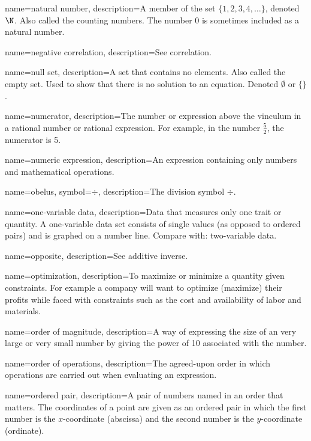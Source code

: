  {
	name=natural number,
	description={A member of the set $\{1, 2, 3, 4, \dotsc\}$, denoted $\N$. Also called the counting numbers. The number 0 is sometimes included as a natural number.}
}

 {
	name=negative correlation,
	description={See \gls{correlation}.}
}

 {
	name=null set,
	description={A set that contains no elements. Also called the empty set. Used to show that there is no solution to an equation. Denoted $\emptyset$ or $\{ \}$.}
}

 {
	name=numerator,
	description={The number or expression above the \gls{vinculum} in a \gls{rational number} or \gls{rational expression}. For example, in the number $\frac{5}{2}$, the numerator is 5.}
}

 {
	name=numeric expression,
	description={An expression containing only numbers and mathematical operations.}
}

 {
	name=obelus,
	symbol={$\div$},
	description={The division symbol $\div$.}
}

 {
	name=one-variable data,
	description={Data that measures only one trait or quantity. A one-variable data set consists of single values (as opposed to ordered pairs) and is graphed on a number line. Compare with: \gls{two-variable data}.}
}

 {
	name=opposite,
	description={See \gls{additive inverse}.}
}

 {
	name=optimization,
	description={To maximize or minimize a quantity given constraints. For example a company will want to optimize (maximize) their profits while faced with constraints such as the cost and availability of labor and materials.}
}

 {
	name=order of magnitude,
	description={A way of expressing the size of an very large or very small number by giving the power of 10 associated with the number.}
}

 {
	name=order of operations,
	description={The agreed-upon order in which operations are carried out when evaluating an expression.}
}

 {
	name=ordered pair,
	description={A pair of numbers named in an order that matters. The coordinates of a point are given as an ordered pair in which the first number is the $x$-coordinate (abscissa) and the second number is the $y$-coordinate (ordinate).}
}

